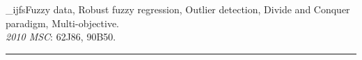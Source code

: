 \documentclass{IJFS}
\begin{document}
\keywords_ijfs{Fuzzy data,
Robust fuzzy regression,
Outlier detection,
Divide and Conquer paradigm,
Multi-objective.
\vspace{1mm}\\
{\it 2010 MSC}: 62J86, 90B50.
}

\Vol{*}	\No{*}	\Year{****}	\Pages{**}
\Received{**}	\Revised{**}		\Accepted{**}

{\let\newpage\relax\vspace*{.1mm}
\noindent\rule{\textwidth}{.3mm}\maketitle}

\thispagestyle{fancylogo}

\mabstract
\end{document}
